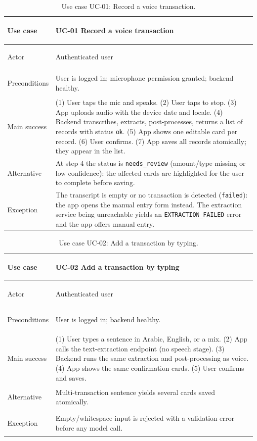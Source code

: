 \begin{table}[H]
\centering
\caption{Use case UC-01: Record a voice transaction.}
\label{tab:uc-voice}
\small
\renewcommand{\arraystretch}{1.3}
\begin{tabularx}{\textwidth}{>{\bfseries\raggedright\arraybackslash}p{3cm} X}
\toprule
Use case & UC-01 Record a voice transaction \\
\midrule
Actor & Authenticated user \\
Preconditions & User is logged in; microphone permission granted; backend healthy. \\
Main success & (1) User taps the mic and speaks. (2) User taps to stop. (3) App uploads audio with the device date and locale. (4) Backend transcribes, extracts, post-processes, returns a list of records with status \texttt{ok}. (5) App shows one editable card per record. (6) User confirms. (7) App saves all records atomically; they appear in the list. \\
Alternative & At step 4 the status is \texttt{needs\_review} (amount/type missing or low confidence): the affected cards are highlighted for the user to complete before saving. \\
Exception & The transcript is empty or no transaction is detected (\texttt{failed}): the app opens the manual entry form instead. The extraction service being unreachable yields an \texttt{EXTRACTION\_FAILED} error and the app offers manual entry. \\
\bottomrule
\end{tabularx}
\end{table}

\begin{table}[H]
\centering
\caption{Use case UC-02: Add a transaction by typing.}
\label{tab:uc-text}
\small
\renewcommand{\arraystretch}{1.3}
\begin{tabularx}{\textwidth}{>{\bfseries\raggedright\arraybackslash}p{3cm} X}
\toprule
Use case & UC-02 Add a transaction by typing \\
\midrule
Actor & Authenticated user \\
Preconditions & User is logged in; backend healthy. \\
Main success & (1) User types a sentence in Arabic, English, or a mix. (2) App calls the text-extraction endpoint (no speech stage). (3) Backend runs the same extraction and post-processing as voice. (4) App shows the same confirmation cards. (5) User confirms and saves. \\
Alternative & Multi-transaction sentence yields several cards saved atomically. \\
Exception & Empty/whitespace input is rejected with a validation error before any model call. \\
\bottomrule
\end{tabularx}
\end{table}

